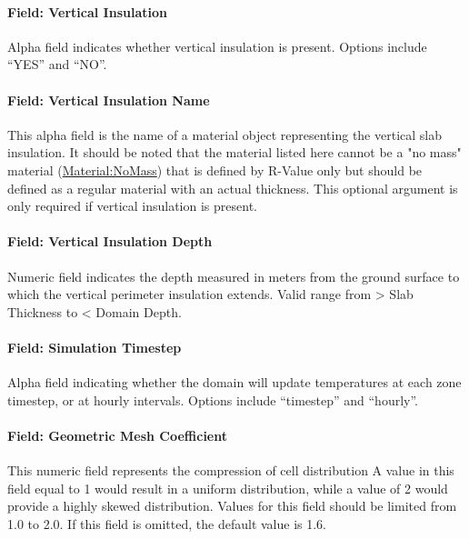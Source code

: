 \paragraph{Field: Vertical Insulation}\label{field-vertical-insulation}

Alpha field indicates whether vertical insulation is present. Options include ``YES'' and ``NO''.

\paragraph{Field: Vertical Insulation Name}\label{field-vertical-insulation-name}

This alpha field is the name of a material object representing the vertical slab insulation. It should be noted that the material listed here cannot be a "no mass" material  (\hyperref[materialnomass]{Material:NoMass}) that is defined by R-Value only but should be defined as a regular material with an actual thickness. This optional argument is only required if vertical insulation is present.

\paragraph{Field: Vertical Insulation Depth}\label{field-vertical-insulation-depth}

Numeric field indicates the depth measured in meters from the ground surface to which the vertical perimeter insulation extends. Valid range from \textgreater{} Slab Thickness to \textless{} Domain Depth.

\paragraph{Field: Simulation Timestep}\label{field-simulation-timestep}

Alpha field indicating whether the domain will update temperatures at each zone timestep, or at hourly intervals. Options include ``timestep'' and ``hourly''.

\paragraph{Field: Geometric Mesh Coefficient}

This numeric field represents the compression of cell distribution A value in this field equal to 1 would result in a uniform distribution, while a value of 2 would provide a highly skewed distribution. Values for this field should be limited from 1.0 to 2.0. If this field is omitted, the default value is 1.6.

